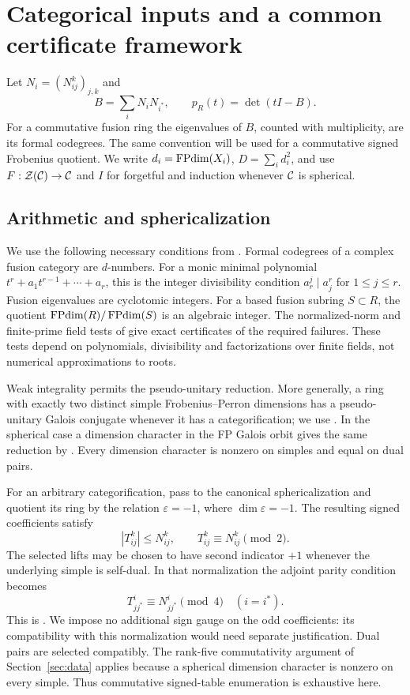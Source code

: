 \section{Categorical inputs and a common certificate framework}
\label{sec:inputs}
Let $N_i=(N_{ij}^k)_{j,k}$ and
\[
 B=\sum_iN_iN_{i^*},\qquad p_R(t)=\det(tI-B).
\]
For a commutative fusion ring the eigenvalues of $B$, counted with
multiplicity, are its formal codegrees. The same convention will be used
for a commutative signed Frobenius quotient. We write $d_i=\operatorname{FPdim}(X_i)$,
$D=\sum_i d_i^2$, and use $F:\mathcal Z(\mathcal C)\to\mathcal C$ and $I$ for forgetful and
induction whenever $\mathcal C$ is spherical.

\subsection{Arithmetic and sphericalization}
We use the following necessary conditions from
\cite[Section 2]{DP}. Formal codegrees of a complex fusion category are
$d$-numbers. For a monic minimal polynomial
$t^r+a_1t^{r-1}+\cdots+a_r$, this is the integer divisibility condition
$a_r^j\mid a_j^r$ for $1\le j\le r$.
Fusion eigenvalues are cyclotomic integers. For a based fusion subring
$S\subset R$, the quotient $\operatorname{FPdim}(R)/\operatorname{FPdim}(S)$ is an algebraic integer.
The normalized-norm and finite-prime field tests of
\cite[Lemmas 2.3--2.4]{DP} give exact certificates of the required failures.
These tests depend on polynomials, divisibility and factorizations over
finite fields, not numerical approximations to roots.

Weak integrality permits the pseudo-unitary reduction. More generally,
a ring with exactly two distinct simple Frobenius--Perron dimensions
has a pseudo-unitary Galois conjugate whenever it has a categorification;
we use \cite[Proposition 2.1]{DP}. In the spherical case a dimension
character in the FP Galois orbit gives the same reduction by
\cite[Lemma 2.2]{DP}. Every dimension character is nonzero on simples
and equal on dual pairs.

For an arbitrary categorification, pass to the canonical sphericalization
and quotient its ring by the relation $\varepsilon=-1$, where
$\dim\varepsilon=-1$. The resulting signed coefficients satisfy
\begin{equation}\label{eq:signed}
 |T_{ij}^k|\le N_{ij}^k,\qquad T_{ij}^k\equiv N_{ij}^k\pmod2.
\end{equation}
The selected lifts may be chosen to have second indicator $+1$ whenever
the underlying simple is self-dual. In that normalization the adjoint
parity condition becomes
\begin{equation}\label{eq:positive-lifts}
 T_{jj^*}^i\equiv N_{jj^*}^i\pmod4
 \quad(i=i^*).
\end{equation}
This is \cite[Lemma 7.1 and Corollary 7.2]{DP}. We impose no additional
sign gauge on the odd coefficients: its compatibility with this
normalization would need separate justification. Dual pairs are selected
compatibly. The rank-five commutativity argument of Section~\ref{sec:data}
applies because a spherical dimension character is nonzero on every
simple. Thus commutative signed-table enumeration is exhaustive here.

